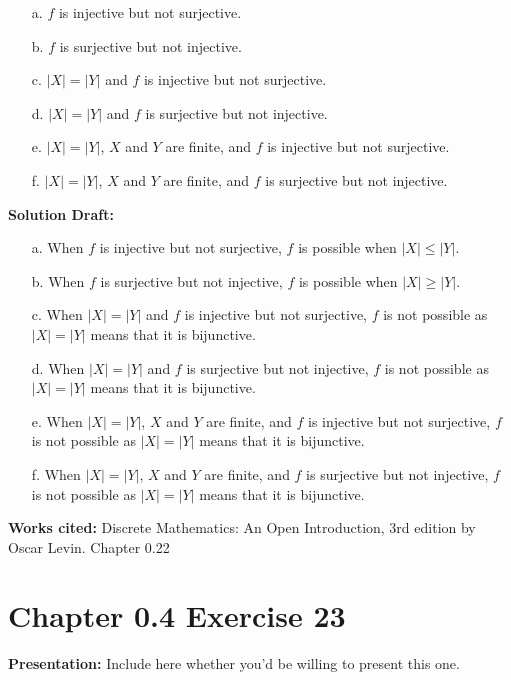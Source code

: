 \documentclass{article}
\begin{document}
\begin{itemize}
    \item[a.] \(f\) is injective but not surjective.
    \item[b.] \(f\) is surjective but not injective.
    \item[c.] \(|X| = |Y|\) and \(f\) is injective but not surjective.
    \item[d.] \(|X| = |Y|\) and \(f\) is surjective but not injective.
    \item[e.] \(|X| = |Y|\), \(X\) and \(Y\) are finite, and \(f\) is injective but not surjective.
    \item[f.] \(|X| = |Y|\), \(X\) and \(Y\) are finite, and \(f\) is surjective but not injective.
\end{itemize}

\noindent\textbf{Solution Draft:} 

\begin{itemize}
    \item[a.] When \(f\) is injective but not surjective, $f$ is possible when $|X| \le |Y|$.
    \item[b.] When \(f\) is surjective but not injective, $f$ is possible when $|X| \ge |Y|$.
    \item[c.] When \(|X| = |Y|\) and \(f\) is injective but not surjective, $f$ is not possible as \(|X| = |Y|\) means that it is bijunctive.
    \item[d.] When \(|X| = |Y|\) and \(f\) is surjective but not injective, $f$ is not possible as \(|X| = |Y|\) means that it is bijunctive.
    \item[e.] When \(|X| = |Y|\), \(X\) and \(Y\) are finite, and \(f\) is injective but not surjective, $f$ is not possible as \(|X| = |Y|\) means that it is bijunctive.
    \item[f.] When \(|X| = |Y|\), \(X\) and \(Y\) are finite, and \(f\) is surjective but not injective, $f$ is not possible as \(|X| = |Y|\) means that it is bijunctive.
\end{itemize}
\vspace{0.5cm}
\textbf{Works cited:}
Discrete Mathematics: An Open Introduction, 3rd edition by Oscar Levin. Chapter 0.22
\section*{Chapter 0.4 Exercise 23}  

\noindent\textbf{Presentation:} Include here whether you'd be willing to present this one. 
\end{document}
